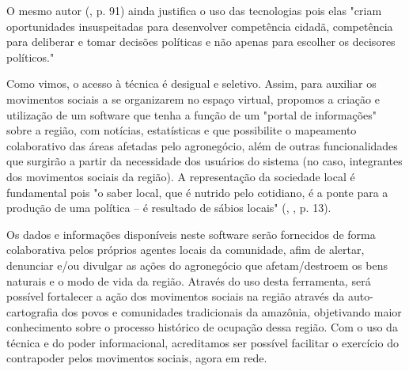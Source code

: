 O mesmo autor (\citeyear{boaventura2005}, p. 91) ainda justifica o uso das tecnologias pois elas "criam oportunidades insuspeitadas para desenvolver competência cidadã, competência para deliberar e tomar decisões políticas e não apenas para escolher os decisores políticos."

Como vimos, o acesso à técnica é desigual e seletivo. Assim, para auxiliar os movimentos sociais a se organizarem no espaço virtual, propomos a criação e utilização de um software que tenha a função de um "portal de informações" sobre a região, com notícias, estatísticas e que possibilite o mapeamento colaborativo das áreas afetadas pelo agronegócio, além de outras funcionalidades que surgirão a partir da necessidade dos usuários do sistema (no caso, integrantes dos movimentos sociais da região). A representação da sociedade local é fundamental pois "o saber local, que é nutrido pelo cotidiano, é a ponte para a produção de uma política – é resultado de sábios locais" (\citeauthor{santos1999}, \citeyear{santos1999}, p. 13). 

Os dados e informações disponíveis neste software serão fornecidos de forma colaborativa pelos próprios agentes locais da comunidade, afim de alertar, denunciar e/ou divulgar as ações do agronegócio que afetam/destroem os bens naturais e o modo de vida da região. Através do uso desta ferramenta, será possível fortalecer a ação dos movimentos sociais na região através da auto-cartografia dos povos e comunidades tradicionais da amazônia, objetivando maior conhecimento sobre o processo histórico de ocupação dessa região. Com o uso da técnica e do poder informacional, acreditamos ser possível facilitar o exercício do contrapoder pelos movimentos sociais, agora em rede.

